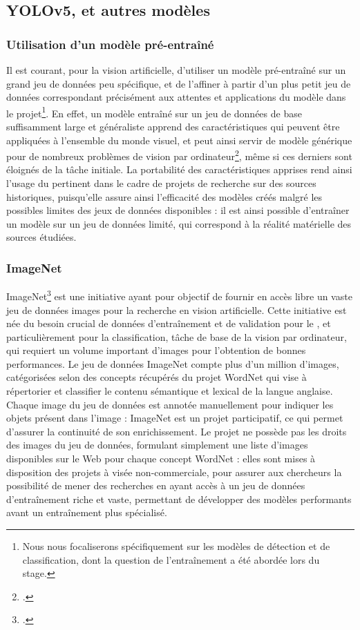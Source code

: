 
\subsection{YOLOv5, \docex et autres modèles}
    \subsubsection{Utilisation d'un modèle pré-entraîné}
	Il est courant, pour la vision artificielle, d'utiliser un modèle pré-entraîné sur un grand jeu de données peu spécifique, et de l'affiner à partir d'un plus petit jeu de données correspondant précisément aux attentes et applications du modèle dans le projet\footnote{Nous nous focaliserons spécifiquement sur les modèles de détection et de classification, dont la question de l'entraînement a été abordée lors du stage.}. En effet, un modèle entraîné sur un jeu de données de base suffisamment large et généraliste apprend des caractéristiques qui peuvent être appliquées à l'ensemble du monde visuel, et peut ainsi servir de modèle générique pour de nombreux problèmes de vision par ordinateur\footcite{cholletApprentissageProfondAvec2020a}, même si ces derniers sont éloignés de la tâche initiale. La portabilité des caractéristiques apprises rend ainsi l'usage du \dl pertinent dans le cadre de projets de recherche sur des sources historiques, puisqu'elle assure ainsi l'efficacité des modèles créés malgré les possibles limites des jeux de données disponibles : il est ainsi possible d'entraîner un modèle sur un jeu de données limité, qui correspond à la réalité matérielle des sources étudiées. 
	
	\subsubsection{ImageNet} 
	ImageNet\footcite{ImageNet} est une initiative ayant pour objectif de fournir en accès libre un vaste jeu de données images pour la recherche en vision artificielle. Cette initiative est née du besoin crucial de données d'entraînement et de validation pour le \ml, et particulièrement pour la classification, tâche de base de la vision par ordinateur, qui requiert un volume important d'images pour l'obtention de bonnes performances. Le jeu de données ImageNet compte plus d'un million d'images, catégorisées selon des concepts récupérés du projet WordNet qui vise à répertorier et classifier le contenu sémantique et lexical de la langue anglaise. Chaque image du jeu de données est annotée manuellement pour indiquer les objets présent dans l'image : ImageNet est un projet participatif, ce qui permet d'assurer la continuité de son enrichissement. Le projet ne possède pas les droits des images du jeu de données, formulant simplement une liste d'images disponibles sur le Web pour chaque concept WordNet : elles sont mises à disposition des projets à visée non-commerciale, pour assurer aux chercheurs la possibilité de mener des recherches en ayant accès à un jeu de données d'entraînement riche et vaste, permettant de développer des modèles performants avant un entraînement plus spécialisé.
    
